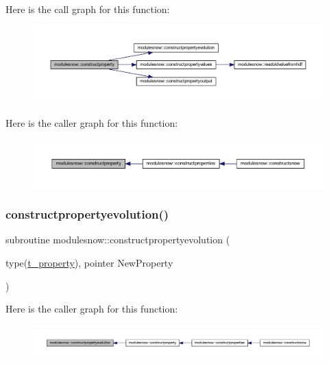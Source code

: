 Here is the call graph for this function\+:\nopagebreak
\begin{figure}[H]
\begin{center}
\leavevmode
\includegraphics[width=350pt]{namespacemodulesnow_a1ebff32e94c1fd5415eb41bb77f7b10a_cgraph}
\end{center}
\end{figure}
Here is the caller graph for this function\+:\nopagebreak
\begin{figure}[H]
\begin{center}
\leavevmode
\includegraphics[width=350pt]{namespacemodulesnow_a1ebff32e94c1fd5415eb41bb77f7b10a_icgraph}
\end{center}
\end{figure}
\mbox{\label{namespacemodulesnow_ac9ddc053b9b4396306dc907dad5c1c95}} 
\subsubsection{\texorpdfstring{constructpropertyevolution()}{constructpropertyevolution()}}
{\footnotesize\ttfamily subroutine modulesnow\+::constructpropertyevolution (\begin{DoxyParamCaption}\item[{type(\mbox{\hyperlink{structmodulesnow_1_1t__property}{t\+\_\+property}}), pointer}]{New\+Property }\end{DoxyParamCaption})\hspace{0.3cm}{\ttfamily [private]}}

Here is the caller graph for this function\+:\nopagebreak
\begin{figure}[H]
\begin{center}
\leavevmode
\includegraphics[width=350pt]{namespacemodulesnow_ac9ddc053b9b4396306dc907dad5c1c95_icgraph}
\end{center}
\end{figure}
\mbox{\label{namespacemodulesnow_a70bdbf0fe6f049a855b8643892b060a2}} 
